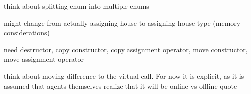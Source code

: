 
\begin{DoxyRefList}
\item[\label{_dev_stage2__DevStage2000012}%
\hypertarget{_dev_stage2__DevStage2000012}{}%
Member \hyperlink{namespacesolar__core_aa1147341e5ef7a40d68d1bd68e149362}{solar\+\_\+core\+:\+:E\+Param\+Types} ]think about splitting enum into multiple enums 
\item[\label{_dev_stage2__DevStage2000004}%
\hypertarget{_dev_stage2__DevStage2000004}{}%
Class \hyperlink{classsolar__core_1_1_household}{solar\+\_\+core\+:\+:Household} ]might change from actually assigning house to assigning house type (memory considerations) 
\item[\label{_dev_stage2__DevStage2000005}%
\hypertarget{_dev_stage2__DevStage2000005}{}%
Member \hyperlink{classsolar__core_1_1_household_a165b7c64c72e5ed4ea08307e32082517}{solar\+\_\+core\+:\+:Household\+:\+:ac\+\_\+inf\+\_\+quoting\+\_\+sei} ()]need destructor, copy constructor, copy assignment operator, move constructor, move assignment operator

think about moving difference to the virtual call. For now it is explicit, as it is assumed that agents themselves realize that it will be online vs offline quote 


\end{DoxyRefList}
